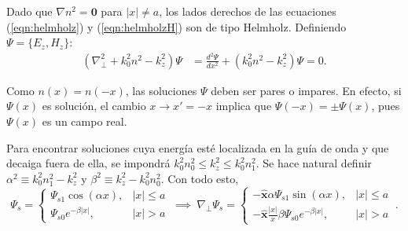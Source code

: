 Dado que $\nabla n^2 = \textbf{0}$ para $|x| \neq a$, los lados derechos de las ecuaciones (\ref{eqn:helmholz}) y (\ref{eqn:helmholzH}) son de tipo Helmholz. Definiendo $\Psi = \{E_z, H_z\} $:
\begin{align*}
	(\nabla_\perp^2  + k_0^2n^2 - k_z^2) \Psi  &=  \frac{d^2\Psi}{dx^2} + (k_0^2n^2 - k_z^2) \Psi  = 0.
\end{align*}

Como $n(x)=n(-x)$, las soluciones $\Psi$ deben ser pares o impares. En efecto, si $\Psi(x)$ es solución, el cambio $x\to x'=-x$ implica que $\Psi(-x)=\pm \Psi(x)$, pues $\Psi(x)$ es un campo real.

Para encontrar soluciones cuya energía esté localizada en la guía de onda y que decaiga fuera de ella, se impondrá $k_0^2n_0^2 \le k_z^2 \le k_0^2n_1^2$. Se hace natural definir $\alpha^2\equiv k_0^2n_1^2-k_z^2$ y $\beta^2\equiv k_z^2 - k_0^2n_0^2$. Con todo esto, 
\begin{equation*}
	\Psi_s = \left\{\begin{matrix}
	\Psi_{s1}\cos(\alpha x), & |x|\le a
	\\
	\Psi_{s0}e^{-\beta|x|}, & |x|>a
	\end{matrix}\right.
	\
	\implies 	
	\	
	\nabla_\perp \Psi_s = \left\{\begin{matrix}
	-\hat{\textbf{x}}\alpha\Psi_{s1}\sin(\alpha x), & |x|\le a
	\\
	-\hat{\textbf{x}}\frac{|x|}{x}\beta\Psi_{s0}e^{-\beta|x|}, & |x|>a
	\end{matrix}\right.
	\
	.
\end{equation*}

